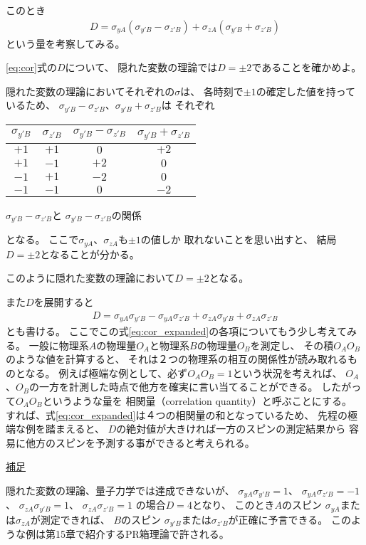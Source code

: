 \documentclass[a4paper, 10pt]{jsarticle}
\makeatletter
\newcommand{\tblcaption}[1]{\def\@captype{table}\caption{#1}}
\makeatother
\begin{document}
このとき
\begin{align}
	D = \sigma_{yA} \left( \sigma_{y'B} - \sigma_{z'B} \right)
	+ \sigma_{zA} \left( \sigma_{y'B} + \sigma_{z'B} \right)
	\label{eq:cor}
\end{align}
という量を考察してみる。
\begin{problem}
	\eqref{eq:cor}式の$D$について、
	隠れた変数の理論では$D = \pm 2$であることを確かめよ。

	\tcblower

	隠れた変数の理論においてそれぞれの$\sigma$は、
	各時刻で$\pm 1$の確定した値を持っているため、
	$\sigma_{y'B} - \sigma_{z' B}$、$\sigma_{y'B} + \sigma_{z' B}$は
	それぞれ

	\begin{center}
		\begin{tabular}{cccc}
			\hline
			$\sigma_{y'B}$ & $\sigma_{z'B}$ &
			$\sigma_{y'B} - \sigma_{z' B}$ &
			$\sigma_{y'B} + \sigma_{z' B}$ \\
			\hline \hline
			$+1$ & $+1$ & $0$ & $+2$ \\
			$+1$ & $-1$ & $+2$ & $0$ \\
			$-1$ & $+1$ & $-2$ & $0$ \\
			$-1$ & $-1$ & $0$ & $-2$ \\
			\hline
		\end{tabular}
		\tblcaption{$\sigma_{y'B} - \sigma_{z' B}$と
		$\sigma_{y'B} - \sigma_{z' B}$の関係}
		\label{tbl:problem}
	\end{center}
	となる。
	ここで$\sigma_{yA}$、$\sigma_{zA}$も$\pm 1$の値しか
	取れないことを思い出すと、
	結局$D = \pm 2$となることが分かる。
\end{problem}
このように隠れた変数の理論において$D = \pm 2$となる。

また$D$を展開すると
\begin{align}
	D = \sigma_{yA} \sigma_{y'B} - \sigma_{yA} \sigma_{z'B}
	+ \sigma_{zA} \sigma_{y'B} + \sigma_{zA} \sigma_{z'B}
	\label{eq:cor_expanded}
\end{align}
とも書ける。
ここでこの式\eqref{eq:cor_expanded}の各項についてもう少し考えてみる。
一般に物理系$A$の物理量$O_A$と物理系$B$の物理量$O_B$を測定し、
その積$O_A O_B$のような値を計算すると、
それは２つの物理系の相互の関係性が読み取れるものとなる。
例えば極端な例として、必ず$O_A O_B = 1$という状況を考えれば、
$O_A$、$O_B$の一方を計測した時点で他方を確実に言い当てることができる。
したがって$O_A O_B$というような量を
相関量（correlation quantity）と呼ぶことにする。
すれば、式\eqref{eq:cor_expanded}は４つの相関量の和となっているため、
先程の極端な例を踏まえると、
$D$の絶対値が大きければ一方のスピンの測定結果から
容易に他方のスピンを予測する事ができると考えられる。
\begin{screen}
	\underline{補足}

	隠れた変数の理論、量子力学では達成できないが、
	$\sigma_{yA} \sigma_{y'B} = 1$、
	$\sigma_{yA} \sigma_{z'B} = -1$、
	$\sigma_{zA} \sigma_{y'B} = 1$、
	$\sigma_{zA} \sigma_{z'B} = 1$
	の場合$D = 4$となり、
	このとき$A$のスピン
	$\sigma_{yA}$または$\sigma_{zA}$が測定できれば、
	$B$のスピン
	$\sigma_{y'B}$または$\sigma_{z'B}$が正確に予言できる。
	このような例は第15章で紹介するPR箱理論で許される。
\end{screen}
\end{document}
